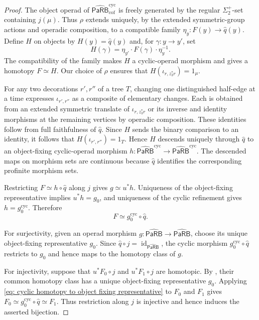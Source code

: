 \documentclass{amsart}
\newcommand{\PaRB}{\mathsf{PaRB}}
\newcommand{\id}{\operatorname{id}}
\theoremstyle{definition}
\numberwithin{equation}{section}
\begin{document}
\begin{proof}
The object operad of
$\widehat{\PaRB}_{\mathrm{cof}}^{\mathrm{cyc}}$ is freely
generated by the regular $\Sigma_2^+$-set containing $j(\mu)$.
Thus $\rho$ extends uniquely, by the extended symmetric-group
actions and operadic composition, to a compatible family
$\eta_y\colon F(y)\to\widehat q(y)$. Define $H$ on objects by
$H(y)=\widehat q(y)$ and, for $\gamma\colon y\to y'$, set
\[
H(\gamma)=\eta_{y'}\cdot F(\gamma)\cdot\eta_y^{-1}.
\]
The compatibility of the family makes $H$ a cyclic-operad morphism
and gives a homotopy $F\simeq H$. Our choice of $\rho$ ensures that
$H(\iota_{r,z_3^*r})=1_\mu$.

For any two decorations $r',r''$ of a tree $T$, changing one
distinguished half-edge at a time expresses $\iota_{r',r''}$ as
a composite of elementary changes. Each is obtained from an
extended symmetric translate of $\iota_{r,z_3^*r}$ or its inverse
and identity morphisms at the remaining vertices by operadic
composition. These identities follow from full faithfulness of
$\widehat q$. Since $H$ sends the binary comparison to an identity,
it follows that $H(\iota_{r',r''})=1_T$. Hence $H$ descends uniquely
through $\widehat q$ to an object-fixing cyclic-operad morphism
$h\colon\widehat{\PaRB}^{\mathrm{cyc}}
\to\widehat{\PaRB}^{\mathrm{cyc}}$. The descended maps on morphism
sets are continuous because $\widehat q$ identifies the corresponding
profinite morphism sets.

Restricting $F\simeq h\circ\widehat q$ along $j$ gives
$g\simeq u^*h$. Uniqueness of the object-fixing representative
implies $u^*h=g_0$, and uniqueness of the cyclic refinement gives
$h=g_0^{\mathrm{cyc}}$. Therefore
\begin{equation}
\label{eq: cyclic homotopy to object fixing representative}
F\simeq g_0^{\mathrm{cyc}}\circ\widehat q.
\end{equation}

For surjectivity, given an operad morphism
$g\colon\widehat{\PaRB}\to\widehat{\PaRB}$, choose its unique
object-fixing representative $g_0$. Since
$\widehat q\circ j=\id_{\widehat{\PaRB}}$, the cyclic morphism
$g_0^{\mathrm{cyc}}\circ\widehat q$ restricts to $g_0$ and hence
maps to the homotopy class of $g$.

For injectivity, suppose that $u^*F_0\circ j$ and $u^*F_1\circ j$
are homotopic. By
\cite[Proposition~8.1]{Boavida-Horel-Robertson}, their common
homotopy class has a unique object-fixing representative $g_0$.
Applying \eqref{eq: cyclic homotopy to object fixing representative}
to $F_0$ and $F_1$ gives
$F_0\simeq g_0^{\mathrm{cyc}}\circ\widehat q\simeq F_1$.
Thus restriction along $j$ is injective and hence induces the
asserted bijection.
\end{proof}
\end{document}
